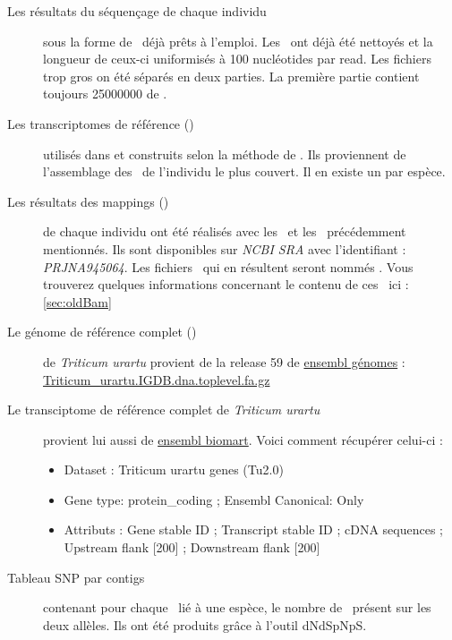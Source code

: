 \documentclass[../main]{subfiles} %
\begin{document}
\begin{description}
    \item[Les résultats du \gls{séquençage} de chaque individu] sous la forme de \fastq déjà prêts à l’emploi. Les \reads ont déjà été nettoyés et la longueur de ceux-ci uniformisés à 100 nucléotides par \gls{read}. Les fichiers trop gros on été séparés en deux parties. La première partie contient toujours \num{25 000 000} de \reads.
    
    \item[Les \glspl{transcriptome} de référence (\TrEx)] utilisés dans \cite{glemin_pervasive_2019} et construits selon la méthode de \cite{sarah_large_2017}. Ils proviennent de l'\gls{assemblage} des \reads de l’individu le plus couvert. Il en existe un par espèce. 

    \item[Les résultats des \glspl{mapping} (\OldBam)]  de chaque individu ont été réalisés avec les \fastq et les \TrEx précédemment mentionnés. Ils sont disponibles sur \textit{NCBI SRA} avec l'identifiant : \textit{PRJNA945064}. Les fichiers \bam qui en résultent seront nommés \OldBam. Vous trouverez quelques informations concernant le contenu de ces \bam ici : \cref{sec:oldBam}

    \item[Le génome de référence complet  (\GeMo)] de \textit{Triticum urartu} provient de la release 59 de \href{https://www.ensembl.org}{ensembl génomes} : \href{https://ftp.ebi.ac.uk/ensemblgenomes/pub/release-59/plants/fasta/triticum_urartu/dna/Triticum_urartu.IGDB.dna.toplevel.fa.gz}{Triticum\_urartu.IGDB.dna.toplevel.fa.gz} 

    \item[Le transciptome de référence complet  de \textit{Triticum urartu}] provient lui aussi de \href{https://www.ensembl.org}{ensembl biomart}. Voici comment récupérer celui-ci :
    \begin{itemize}
        \item Dataset : Triticum urartu genes (Tu2.0)
        \item Gene type: protein\_coding ; Ensembl Canonical: Only
        \item Attributs :  Gene stable ID ; Transcript stable ID ; cDNA sequences ; Upstream flank [200] ; Downstream flank [200]
    \end{itemize}
    
    \item[Tableau SNP par contigs ] contenant pour chaque \contig lié à une espèce, le nombre de \SNP présent sur les deux  
    allèles. Ils ont été produits grâce à l'outil \gls{dNdSpNpS}.


\end{description}
\end{document}
